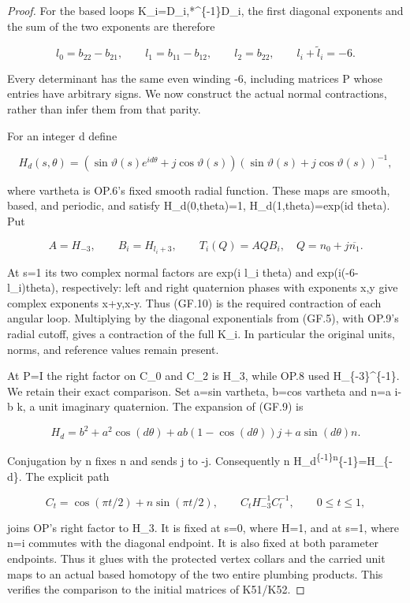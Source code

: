 \begin{proof}
For the based loops K\_i=D\_i,*\^{}\{-1\}D\_i, the first diagonal
exponents and the sum of the two exponents are therefore

\[
 l_0=b_{22}-b_{21},\qquad l_1=b_{11}-b_{12},\qquad
 l_2=b_{22},\qquad l_i+\widetilde l_i=-6.              \tag{GF.8}
\]

Every determinant has the same even winding -6, including matrices
P whose entries have arbitrary signs. We now construct the actual
normal contractions, rather than infer them from that parity.

For an integer d define

\[
 H_d(s,\theta)=
 (\sin\vartheta(s)e^{id\theta}+j\cos\vartheta(s))
                    (\sin\vartheta(s)+j\cos\vartheta(s))^{-1},
                                                               \tag{GF.9}
\]

where vartheta is OP.6's fixed smooth radial function. These maps
are smooth, based, and periodic, and satisfy H\_d(0,theta)=1,
H\_d(1,theta)=exp(id theta). Put

\[
 A=H_{-3},\qquad B_i=H_{l_i+3},\qquad
                  T_i(Q)=A Q B_i,
 \quad Q=n_0+j\overline{n_1}.                         \tag{GF.10}
\]

At s=1 its two complex normal factors are exp(i l\_i theta)
and exp(i(-6-l\_i)theta), respectively: left and right quaternion
phases with exponents x,y give complex exponents x+y,x-y.
Thus (GF.10) is the required contraction of each angular loop.
Multiplying by the diagonal exponentials from (GF.5), with OP.9's
radial cutoff, gives a contraction of the full K\_i. In particular
the original units, norms, and reference values remain present.

At P=I the right factor on C\_0 and C\_2 is H\_3, while OP.8 used
H\_\{-3\}\^{}\{-1\}. We retain their exact comparison. Set a=sin vartheta,
b=cos vartheta and n=a i-b k, a unit imaginary quaternion. The
expansion of (GF.9) is

\[
 H_d=b^2+a^2\cos(d\theta)
       +ab(1-\cos(d\theta))j+a\sin(d\theta)n.
\]

Conjugation by n fixes n and sends j to -j. Consequently
n H\_d\textsuperscript{\{-1\}n}\{-1\}=H\_\{-d\}. The explicit path

\[
 C_t=\cos(\pi t/2)+n\sin(\pi t/2),\qquad
 C_tH_{-3}^{-1}C_t^{-1},\qquad 0\leq t\leq1,
                                                               \tag{GF.10a}
\]

joins OP's right factor to H\_3. It is fixed at s=0, where H=1,
and at s=1, where n=i commutes with the diagonal endpoint. It is
also fixed at both parameter endpoints. Thus it glues with the
protected vertex collars and the carried unit maps to an actual
based homotopy of the two entire plumbing products. This verifies
the comparison to the initial matrices of K51/K52.


\end{proof}
